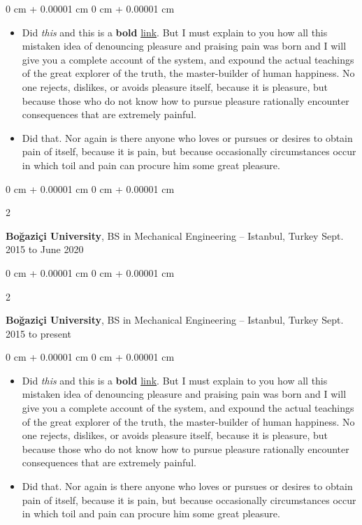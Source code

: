 \documentclass[10pt, letterpaper]{article}
\newenvironment{highlights}{
    \begin{itemize}[
        topsep=0.10 cm,
        parsep=0.10 cm,
        partopsep=0pt,
        itemsep=0pt,
        leftmargin=0 cm + 10pt
    ]
}{
    \end{itemize}
} %
\newenvironment{onecolentry}{
    \begin{adjustwidth}{
        0 cm + 0.00001 cm
    }{
        0 cm + 0.00001 cm
    }
}{
    \end{adjustwidth}
} %
\newenvironment{twocolentry}[2][]{
    \onecolentry
    \def\secondColumn{#2}
    \setcolumnwidth{\fill, 4.5 cm}
    \begin{paracol}{2}
}{
    \switchcolumn \raggedleft \secondColumn
    \end{paracol}
    \endonecolentry
} %
\begin{document}
        \vspace{0.10 cm}
        \begin{onecolentry}
            \begin{highlights}
                \item Did \textit{this} and this is a \textbf{bold} \href{https://example.com}{link}. But I must explain to you how all this mistaken idea of denouncing pleasure and praising pain was born and I will give you a complete account of the system, and expound the actual teachings of the great explorer of the truth, the master-builder of human happiness. No one rejects, dislikes, or avoids pleasure itself, because it is pleasure, but because those who do not know how to pursue pleasure rationally encounter consequences that are extremely painful.
                \item Did that. Nor again is there anyone who loves or pursues or desires to obtain pain of itself, because it is pain, but because occasionally circumstances occur in which toil and pain can procure him some great pleasure.
            \end{highlights}
        \end{onecolentry}


        \vspace{0.2 cm}

        \begin{twocolentry}{
            Sept. 2015 to June 2020
        }
            \textbf{Boğaziçi University}, BS in Mechanical Engineering -- Istanbul, Turkey\end{twocolentry}



        \vspace{0.2 cm}

        \begin{twocolentry}{
            Sept. 2015 to present
        }
            \textbf{Boğaziçi University}, BS in Mechanical Engineering -- Istanbul, Turkey\end{twocolentry}

        \vspace{0.10 cm}
        \begin{onecolentry}
            \begin{highlights}
                \item Did \textit{this} and this is a \textbf{bold} \href{https://example.com}{link}. But I must explain to you how all this mistaken idea of denouncing pleasure and praising pain was born and I will give you a complete account of the system, and expound the actual teachings of the great explorer of the truth, the master-builder of human happiness. No one rejects, dislikes, or avoids pleasure itself, because it is pleasure, but because those who do not know how to pursue pleasure rationally encounter consequences that are extremely painful.
                \item Did that. Nor again is there anyone who loves or pursues or desires to obtain pain of itself, because it is pain, but because occasionally circumstances occur in which toil and pain can procure him some great pleasure.
            \end{highlights}
        \end{onecolentry}
\end{document}

